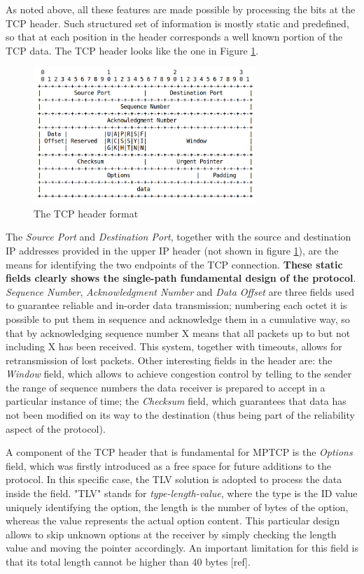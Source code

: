 As noted above, all these features are made possible by processing the bits at the TCP header. Such structured set of information is mostly static and predefined, so that at each position in the header corresponds a well known portion of the TCP data. The TCP header looks like the one in Figure \ref{fig:tcp_header}.

\begin{figure}[!htb]
\centering
\includegraphics[width=0.75\textwidth]{images/tcp_header}
\caption{The TCP header format}
\label{fig:tcp_header}
\end{figure}

The \textit{Source Port} and \textit{Destination Port}, together with the source and destination IP addresses provided in the upper IP header (not shown in figure \ref{fig:tcp_header}), are the means for identifying the two endpoints of the TCP connection. \textbf{These static fields clearly shows the single-path fundamental design of the protocol}. \textit{Sequence Number}, \textit{Acknowledgment Number} and \textit{Data Offset} are three fields used to guarantee reliable and in-order data transmission; numbering each octet it is possible to put them in sequence and acknowledge them in a cumulative way, so that by acknowledging sequence number X means that all packets up to but not including X has been received. This system, together with timeouts, allows for retransmission of lost packets.
Other interesting fields in the header are: the \textit{Window} field, which allows to achieve congestion control by telling to the sender the range of sequence numbers the data receiver is prepared to accept in a particular instance of time; the \textit{Checksum} field, which guarantees that data has not been modified on its way to the destination (thus being part of the reliability aspect of the protocol).


A component of the TCP header that is fundamental for MPTCP is the \textit{Options} field, which was firstly introduced as a free space for future additions to the protocol. In this specific case, the TLV solution is adopted to process the data inside the field. "TLV" stands for \textit{type-length-value}, where the type is the ID value uniquely identifying the option, the length is the number of bytes of the option, whereas the value represents the actual option content. This particular design allows to skip unknown options at the receiver by simply checking the length value and moving the pointer accordingly. An important limitation for this field is that its total length cannot be higher than 40 bytes [ref].

